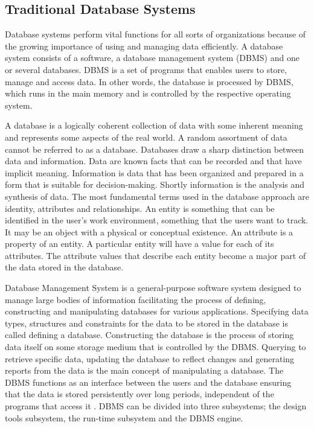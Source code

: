 \subsection{Traditional Database Systems}
Database systems perform vital functions for all sorts of organizations because
of the growing importance of using and managing data efficiently. A database
system consists of a software, a database management system (DBMS) and one or
several databases. DBMS is a set of programs that enables users to store, manage
and access data. In other words, the database is processed by DBMS, which runs
in the main memory and is controlled by the respective operating system.

A database is a logically coherent collection of data with some inherent meaning
and represents some aspects of the real world. A random assortment of data
cannot be referred to as a database. Databases draw a sharp distinction between
data and information. Data are known facts that can be recorded and that have
implicit meaning. Information is data that has been organized and prepared in a
form that is suitable for decision-making. Shortly information is the analysis
and synthesis of data. The most fundamental terms used in the database approach
are identity, attributes and relationships. An entity is something that can be
identified in the user's work environment, something that the users want to
track. It may be an object with a physical or conceptual existence. An attribute
is a property of an entity. A particular entity will have a value for each of
its attributes. The attribute values that describe each entity become a major
part of the data stored in the database.

Database Management System is a general-purpose software system designed to
manage large bodies of information facilitating the process of defining,
constructing and manipulating databases for various applications. Specifying
data types, structures and constraints for the data to be stored in the database
is called defining a database. Constructing the database is the process of
storing data itself on some storage medium that is controlled by the DBMS.
Querying to retrieve specific data, updating the database to reflect changes and
generating reports from the data is the main concept of manipulating a database.
The DBMS functions as an interface between the users and the database ensuring
that the data is stored persistently over long periods, independent of the
programs that access it \cite{latisen1998}. DBMS can be divided into three
subsystems; the design tools subsystem, the run-time subsystem and the DBMS
engine.

